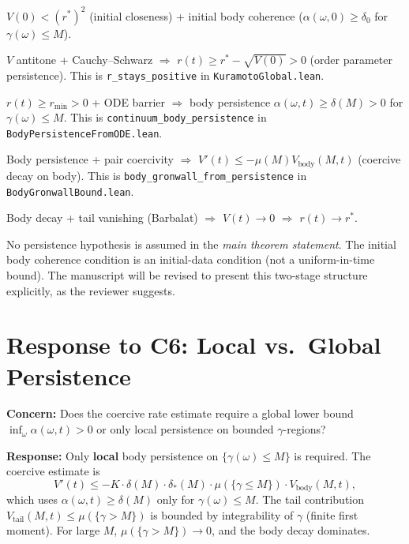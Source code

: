 \documentclass[11pt]{article}
\theoremstyle{plain}
\begin{document}
\begin{description}[leftmargin=3cm,style=nextline]
\item[Input:] $V(0) < (r^*)^2$ (initial closeness) + initial body coherence ($\alpha(\omega,0) \geq \delta_0$ for $\gamma(\omega) \leq M$).
\item[Stage I:] $V$ antitone + Cauchy--Schwarz $\Rightarrow$ $r(t) \geq r^* - \sqrt{V(0)} > 0$ (order parameter persistence). This is \texttt{r\_stays\_positive} in \texttt{KuramotoGlobal.lean}.
\item[Stage II:] $r(t) \geq r_{\min} > 0$ + ODE barrier $\Rightarrow$ body persistence $\alpha(\omega,t) \geq \delta(M) > 0$ for $\gamma(\omega) \leq M$. This is \texttt{continuum\_body\_persistence} in \texttt{BodyPersistenceFromODE.lean}.
\item[Stage III:] Body persistence + pair coercivity $\Rightarrow$ $V'(t) \leq -\mu(M) V_{\text{body}}(M,t)$ (coercive decay on body). This is \texttt{body\_gronwall\_from\_persistence} in \texttt{BodyGronwallBound.lean}.
\item[Stage IV:] Body decay + tail vanishing (Barbalat) $\Rightarrow$ $V(t) \to 0$ $\Rightarrow$ $r(t) \to r^*$.
\end{description}

No persistence hypothesis is assumed in the \emph{main theorem statement}. The initial body coherence condition is an initial-data condition (not a uniform-in-time bound). The manuscript will be revised to present this two-stage structure explicitly, as the reviewer suggests.

\section*{Response to C6: Local vs.\ Global Persistence}

\textbf{Concern:} Does the coercive rate estimate require a global lower bound $\inf_\omega \alpha(\omega,t) > 0$ or only local persistence on bounded $\gamma$-regions?

\textbf{Response:} Only \textbf{local} body persistence on $\{\gamma(\omega) \leq M\}$ is required. The coercive estimate is
\[
    V'(t) \leq -K \cdot \delta(M) \cdot \delta_*(M) \cdot \mu(\{\gamma \leq M\}) \cdot V_{\text{body}}(M, t),
\]
which uses $\alpha(\omega,t) \geq \delta(M)$ only for $\gamma(\omega) \leq M$. The tail contribution $V_{\text{tail}}(M,t) \leq \mu(\{\gamma > M\})$ is bounded by integrability of $\gamma$ (finite first moment). For large $M$, $\mu(\{\gamma > M\}) \to 0$, and the body decay dominates.
\end{document}
